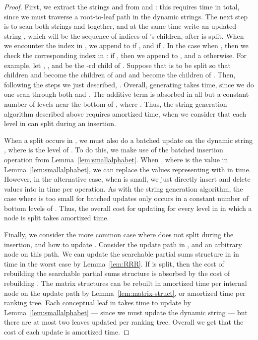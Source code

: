 \documentclass{llncs}
\begin{document}
\begin{proof}
First, we extract the strings  and  from  and
: this requires  time in total, since we must traverse a root-to-leaf path in
the dynamic strings.  The next step is to scan both strings 
and  together, and at the same time write an updated string
, which will be the sequence of indices of 's children,
after  is split.  When we encounter the index  in , we
append  to  if , and  if .  In the case when , then we check the
corresponding index  in : if , then we
append  to , and a  otherwise.  For example, let
, , and
 be the -rd child of .  Suppose that  is to be split so
that children  and  become the children of  and  and 
become the children of .  Then, following the steps we just
described, .  Overall,
generating  takes  time, since we do one scan through both  and .  The
additive  term is absorbed in all but a constant
number of levels near the bottom of , where .  Thus, the string generation
algorithm described above requires  amortized time, when we consider that each level in
 can split during an insertion.

When a split occurs in , we must also do a batched update on the
dynamic string , where  is the level of .  To do
this, we make use of the batched insertion operation from
Lemma~\ref{lem:smallalphabet}.  When , where  is the value in Lemma~\ref{lem:smallalphabet}, we can
replace the  values representing 
with  in  time.  However, in the
alternative case, when  is small, we just directly insert
and delete values into  in  time per
operation.  As with the string generation algorithm, the case where
 is too small for batched updates only occurs in a constant
number of bottom levels of .  Thus, the overall cost for updating
 for every level in  in which a node is split takes
 amortized time.

Finally, we consider the more common case where  does not split
during the insertion, and how to update .  Consider the update
path in , and an arbitrary node  on this path.  We can update
the searchable partial sums structure in  in  time in the
worst case by Lemma~\ref{lem:RRR}.  If  is split, then the cost of
rebuilding the searchable partial sums structure is absorbed by the
cost of rebuilding .  The matrix structures can be rebuilt in
 amortized time per internal node on the update path by
Lemma~\ref{lem:matrix-struct}, or  amortized
time per ranking tree.  Each conceptual leaf in  takes  time to update by Lemma~\ref{lem:smallalphabet} --- since
we must update the dynamic string --- but there are at most two leaves
updated per ranking tree.  Overall we get that the cost of each update
is  amortized time.  
\end{proof}
\end{document}
